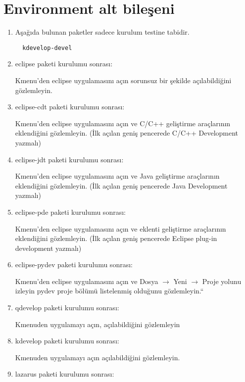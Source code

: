 \documentclass[a4paper,10pt]{article}
\begin{document}
\section{Environment alt bileşeni}
\begin{enumerate}

\item Aşağıda bulunan paketler sadece kurulum testine tabidir.

 \begin{verbatim}
  kdevelop-devel
 \end{verbatim}

\item eclipse paketi kurulumu sonrası:

Kmenu'den eclipse uygulamasını açın sorunsuz bir şekilde açılabildiğini gözlemleyin.

\item eclipse-cdt paketi kurulumu sonrası:

Kmenu'den eclipse uygulamasını açın ve C/C++ geliştirme araçlarının eklendiğini gözlemleyin. (İlk açılan geniş pencerede C/C++ Development yazmalı)

\item eclipse-jdt paketi kurulumu sonrası:

Kmenu'den eclipse uygulamasını açın ve Java geliştirme araçlarının eklendiğini gözlemleyin. (İlk açılan geniş pencerede Java Development yazmalı)

\item eclipse-pde paketi kurulumu sonrası:

Kmenu'den eclipse uygulamasını açın ve eklenti geliştirme araçlarının eklendiğini gözlemleyin. (İlk açılan geniş pencerede Eclipse plug-in development yazmalı)

\item eclipse-pydev paketi kurulumu sonrası:

Kmenu'den eclipse uygulamasını açın ve Dosya $\rightarrow$ Yeni $\rightarrow$ Proje yolunu izleyin pydev proje bölümü listelenmiş olduğunu gözlemleyin.``

\item qdevelop paketi kurulumu sonrası:

Kmenuden uygulamayı açın, açılabildiğini gözlemleyin

 \item kdevelop paketi kurulumu sonrası: 

Kmenuden uygulamayı açın açılabildiğini gözlemleyin.

 \item lazarus paketi kurulumu sonrası:


\end{enumerate}
\end{document}
